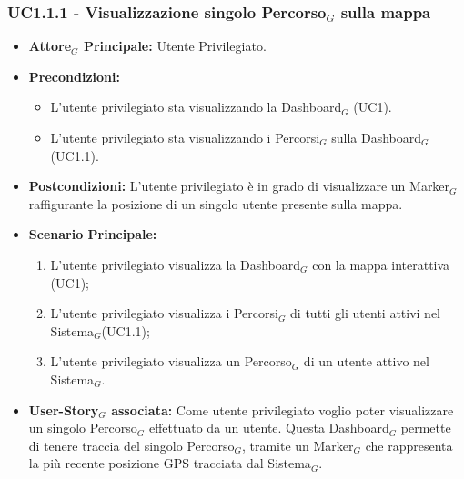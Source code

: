 \documentclass[10pt]{article}
\begin{document}
\begin{justify}
\subsubsection{\textbf{UC1.1.1 - Visualizzazione singolo Percorso$_G$ sulla mappa}}
\label{UC1.1.1}
\begin{itemize}
     \item \textbf{Attore$_G$ Principale:} Utente Privilegiato.
     \item \textbf{Precondizioni:}
        \begin{itemize}
    		\item L'utente privilegiato sta visualizzando la Dashboard$_G$ (UC1).
    		\item L'utente privilegiato sta visualizzando i Percorsi$_G$ sulla Dashboard$_G$ (UC1.1).
        \end{itemize}
     \item \textbf{Postcondizioni:} L'utente privilegiato è in grado di visualizzare un Marker$_G$ raffigurante la posizione di un singolo utente presente sulla mappa.
     \item \textbf{Scenario Principale:}
        \begin{enumerate}
            \item L'utente privilegiato visualizza la Dashboard$_G$ con la mappa interattiva (UC1);
            \item L'utente privilegiato visualizza i Percorsi$_G$ di tutti gli utenti attivi nel Sistema$_G$(UC1.1);
            \item L'utente privilegiato visualizza un Percorso$_G$ di un utente attivo nel Sistema$_G$.
        \end{enumerate}
     \item \textbf{User-Story$_G$ associata:}
     Come utente privilegiato voglio poter visualizzare un singolo Percorso$_G$ effettuato da un utente. Questa Dashboard$_G$ permette di tenere traccia del singolo Percorso$_G$, tramite un Marker$_G$ che rappresenta la più recente posizione GPS tracciata dal Sistema$_G$.
\end{itemize}

\end{justify}
\end{document}
